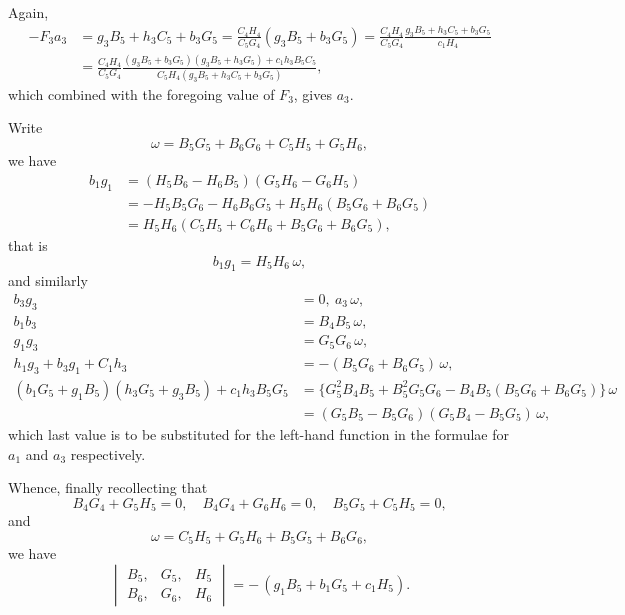 \documentclass[11pt,a4paper]{article}
\begin{document}
\newpage
\setcounter{page}{324}

Again,
\begin{align*}
-F_{3}a_{3} &= g_{3}B_{5}+h_{3}C_{5}+b_{3}G_{5} = \frac{C_{4}H_{4}}{C_{5}G_{4}}(g_{3}B_{5}+b_{3}G_{5}) = \frac{C_{4}H_{4}}{C_{5}G_{4}}\frac{g_{3}B_{5}+h_{3}C_{5}+b_{3}G_{5}}{c_{1}H_{4}}\\
&= \frac{C_{4}H_{4}}{C_{5}G_{4}}\frac{(g_{3}B_{5}+b_{3}G_{5})(g_{3}B_{5}+h_{3}G_{5}) + c_{1}h_{3}B_{5}C_{5}}{C_{5}H_{4}(g_{3}B_{5}+h_{3}C_{5}+b_{3}G_{5})},
\end{align*}
which combined with the foregoing value of $F_{3}$, gives $a_{3}$.

Write
\[
\omega = B_{5}G_{5} + B_{6}G_{6} + C_{5}H_{5} + G_{5}H_{6},
\]
we have
\begin{align*}
b_{1}g_{1} &= (H_{5}B_{6} - H_{6}B_{5})(G_{5}H_{6} - G_{6}H_{5})\\
&= -H_{5}B_{5}G_{6} - H_{6}B_{6}G_{5} + H_{5}H_{6}(B_{5}G_{6} + B_{6}G_{5})\\
&= H_{5}H_{6}(C_{5}H_{5} + C_{6}H_{6} + B_{5}G_{6} + B_{6}G_{5}),
\end{align*}
that is
\[
b_{1}g_{1} = H_{5}H_{6}\, \omega,
\]
and similarly
\begin{align*}
b_{3}g_{3} &= 0,\ a_{3}\, \omega,\\
b_{1}b_{3} &= B_{4}B_{5}\, \omega,\\
g_{1}g_{3} &= G_{5}G_{6}\, \omega,\\
h_{1}g_{3} + b_{3}g_{1} + C_{1}h_{3} &= -(B_{5}G_{6}+B_{6}G_{5})\, \omega,\\
(b_{1}G_{5}+g_{1}B_{5})(h_{3}G_{5}+g_{3}B_{5}) + c_{1}h_{3}B_{5}G_{5} &= \{G_{5}^{2}B_{4}B_{5} + B_{5}^{2}G_{5}G_{6} - B_{4}B_{5}(B_{5}G_{6}+B_{6}G_{5})\}\, \omega\\
&= (G_{5}B_{5} - B_{5}G_{6})(G_{5}B_{4} - B_{5}G_{5})\, \omega,
\end{align*}
which last value is to be substituted for the left-hand function in the formulae for $a_{1}$ and $a_{3}$ respectively.

Whence, finally recollecting that
\[
B_{4}G_{4} + G_{5}H_{5} = 0,\quad B_{4}G_{4} + G_{6}H_{6} = 0,\quad B_{5}G_{5} + C_{5}H_{5} = 0,
\]
and
\[
\omega = C_{5}H_{5} + G_{5}H_{6} + B_{5}G_{5} + B_{6}G_{6},
\]
we have
\[
\begin{vmatrix} B_{5}, & G_{5}, & H_{5}\\ B_{6}, & G_{6}, & H_{6}\end{vmatrix} = -\, (g_{1}B_{5}+b_{1}G_{5}+c_{1}H_{5}).
\]
\end{document}
